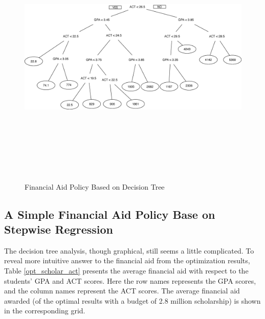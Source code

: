 \documentclass[12pt,english]{report}
\begin{document}
  
 
\begin{figure}
\includegraphics[width=7in, height=5in]{pic/FA_DT_Result.eps}%
\caption{Financial Aid Policy Based on Decision Tree }
\label{FApolicybyDT}
\end{figure}
 

% 

\subsection{A Simple Financial Aid Policy Base on Stepwise Regression}
The decision tree analysis, though graphical, still seems a little complicated.
To reveal more intuitive answer to the financial aid from the optimization
results, Table \ref{opt_scholar_act} presents the average financial aid with
respect to the students' GPA and ACT scores. Here the row names represents the
GPA scores, and the column names represent the ACT scores. The average
financial aid awarded (of the optimal results with a budget of 2.8 million
scholarship) is shown in the corresponding grid.
\end{document}
